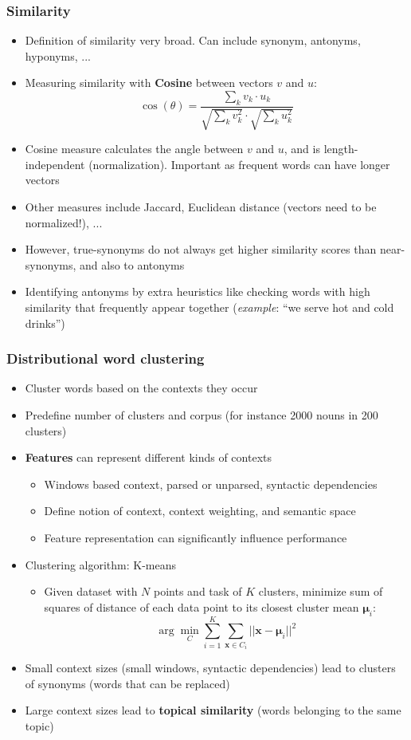 \subsubsection{Similarity}
\begin{itemize}
	\item Definition of similarity very broad. Can include synonym, antonyms, hyponyms, ...
	\item Measuring similarity with \textbf{Cosine} between vectors $v$ and $u$:
	$$\cos\left(\theta\right) = \frac{\sum_k v_k \cdot u_k}{\sqrt{\sum_k v_k^2} \cdot \sqrt{\sum_k u_k^2}}$$
	\item Cosine measure calculates the angle between $v$ and $u$, and is length-independent (normalization). Important as frequent words can have longer vectors
	\item Other measures include Jaccard, Euclidean distance (vectors need to be normalized!), ...
	\item However, true-synonyms do not always get higher similarity scores than near-synonyms, and also to antonyms
	\item Identifying antonyms by extra heuristics like checking words with high similarity that frequently appear together (\textit{example}: ``we serve hot and cold drinks'')
	
\end{itemize}
\subsubsection{Distributional word clustering}
\begin{itemize}
	\item Cluster words based on the contexts they occur
	\item Predefine number of clusters and corpus (for instance 2000 nouns in 200 clusters)
	\item \textbf{Features} can represent different kinds of contexts
	\begin{itemize}
		\item Windows based context, parsed or unparsed, syntactic dependencies
		\item Define notion of context, context weighting, and semantic space 
		\item Feature representation can significantly influence performance
	\end{itemize}
	\item Clustering algorithm: K-means
	\begin{itemize}
		\item Given dataset with $N$ points and task of $K$ clusters, minimize sum of squares of distance of each data point to its closest cluster mean $\bm{\mu}_i$:
		$$\arg\min_C \sum\limits_{i=1}^{K}\sum\limits_{\bm{x}\in C_i} ||\bm{x} - \bm{\mu}_{i}||^2$$
	\end{itemize}
	\item Small context sizes (small windows, syntactic dependencies) lead to clusters of synonyms (words that can be replaced)
	\item Large context sizes lead to \textbf{topical similarity} (words belonging to the same topic)
\end{itemize}

